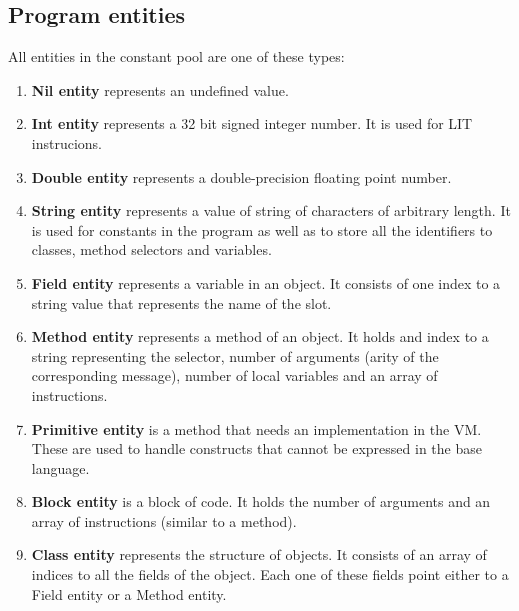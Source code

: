 \documentclass[thesis=M,english]{FITthesis}[2019/12/23]
\begin{document}
\subsection{Program entities}
All entities in the constant pool are one of these types:
\begin{enumerate}
	\item \textbf{Nil entity} represents an undefined value.
	\item \textbf{Int entity} represents a 32 bit signed integer number. It is used for LIT instrucions.
	\item \textbf{Double entity} represents a double-precision floating point number.
	\item \textbf{String entity} represents a value of string of characters of arbitrary length. It is used for
		constants in the program as well as to store all the identifiers to classes, method selectors and variables.
	\item \textbf{Field entity} represents a variable in an object. It consists of one index to a string value that represents
		the name of the slot.
	\item \textbf{Method entity} represents a method of an object. It holds and index to a string representing the selector,
		number of arguments (arity of the corresponding message), number of local variables and an array of instructions.
	\item \textbf{Primitive entity} is a method that needs an implementation in the VM. These are used to handle constructs that
		cannot be expressed in the base language. 
	\item \textbf{Block entity} is a block of code. It holds the number of arguments and an array of instructions (similar
		to a method).
	\item \textbf{Class entity} represents the structure of objects. It consists of an array of indices to all the fields
		of the object. Each one of these fields point either to a Field entity or a Method entity.
\end{enumerate}
\end{document}
